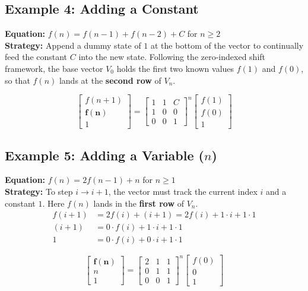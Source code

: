 \documentclass[11pt]{article}
\begin{document}
\subsection{Example 4: Adding a Constant}
\textbf{Equation:} $f(n) = f(n-1) + f(n-2) + C$ for $n \ge 2$ \\
\textbf{Strategy:} Append a dummy state of $1$ at the bottom of the vector to continually feed the constant $C$ into the new state. Following the zero-indexed shift framework, the base vector $V_0$ holds the first two known values $f(1)$ and $f(0)$, so that $f(n)$ lands at the \textbf{second row} of $V_n$.

\[
\begin{bmatrix} f(n+1) \\ \mathbf{f(n)} \\ 1 \end{bmatrix} = 
\begin{bmatrix} 1 & 1 & C \\ 1 & 0 & 0 \\ 0 & 0 & 1 \end{bmatrix}^n 
\begin{bmatrix} f(1) \\ f(0) \\ 1 \end{bmatrix}
\]

\subsection{Example 5: Adding a Variable ($n$)}
\textbf{Equation:} $f(n) = 2f(n-1) + n$ for $n \ge 1$ \\
\textbf{Strategy:} To step $i \to i+1$, the vector must track the current index $i$ and a constant $1$. Here $f(n)$ lands in the \textbf{first row} of $V_n$.
\begin{align*}
    f(i+1) &= 2f(i) + (i+1) = 2f(i) + 1 \cdot i + 1 \cdot 1 \\
    (i+1) &= 0 \cdot f(i) + 1 \cdot i + 1 \cdot 1 \\
    1 &= 0 \cdot f(i) + 0 \cdot i + 1 \cdot 1
\end{align*}

\[
\begin{bmatrix} \mathbf{f(n)} \\ n \\ 1 \end{bmatrix} = 
\begin{bmatrix} 2 & 1 & 1 \\ 0 & 1 & 1 \\ 0 & 0 & 1 \end{bmatrix}^n 
\begin{bmatrix} f(0) \\ 0 \\ 1 \end{bmatrix}
\]
\end{document}
